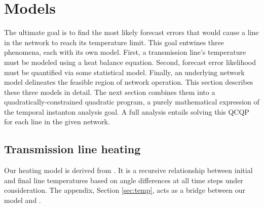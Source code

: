 \documentclass[conference]{IEEEtran}
\begin{document}
\section{Models}\label{sec:models}
The ultimate goal is to find the most likely forecast errors that would cause a line in the network to reach its temperature limit. This goal entwines three phenomena, each with its own model. First, a transmission line's temperature must be modeled using a heat balance equation. Second, forecast error likelihood must be quantified via some statistical model. Finally, an underlying network model delineates the feasible region of network operation. This section describes these three models in detail. The next section combines them into a quadratically-constrained quadratic program, a purely mathematical expression of the temporal instanton analysis goal. A full analysis entails solving this QCQP for each line in the given network.

\subsection{Transmission line heating}\label{sec:heating}

Our heating model is derived from \cite{ieee2013}. It is a recursive relationship between initial and final line temperatures based on angle differences at all time steps under consideration. The appendix, Section \ref{sec:temp}, acts as a bridge between our model and \cite{ieee2013}.
\end{document}
